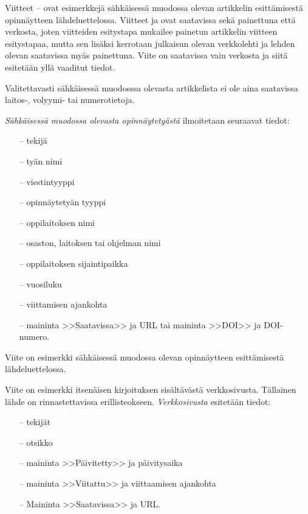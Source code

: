 \documentclass[english,12pt,a4paper,pdftex]{article}
\begin{document}
Viitteet \cite{Ribeiro}--\cite{kone} ovat esimerkkejä sähkäisessä
muodossa olevan artikkelin esittämisestä opinnäytteen
lähdeluettelossa.  Viitteet \cite{Ribeiro} ja \cite{Stieber} ovat
saatavissa sekä painettuna että verkosta, joten viitteiden esitystapa
mukailee painetun artikkelin viitteen esitystapaa, mutta sen lisäksi
kerrotaan julkaisun olevan verkkolehti ja lehden olevan saatavissa
myäs painettuna.  Viite \cite{kone} on saatavissa vain verkosta ja
siitä esitetään yllä vaaditut tiedot.

Valitettavasti sähkäisessä muodosssa olevasta artikkelista ei ole aina
saatavissa lai\-tos-, volyymi- tai numerotietoja.

\textit{Sähkäisessä muodossa olevasta opinnäytetyästä} ilmoitetaan
seuraavat tiedot:

\begin{itemize}
\item[--]tekijä
\item[--]tyän nimi
\item[--]viestintyyppi
\item[--]opinnäytetyän tyyppi
\item[--]oppilaitoksen nimi
\item[--]osaston, laitoksen tai ohjelman nimi
\item[--]oppilaitoksen sijaintipaikka
\item[--]vuosiluku
\item[--]viittamisen ajankohta
\item[--]maininta >>Saatavissa>> ja URL tai
        maininta >>DOI>> ja DOI-numero.
\end{itemize}

Viite \cite{Adida} on esimerkki sähkäisessä muodossa olevan
opinnäytteen esittämisestä lähdeluettelossa.

Viite \cite{viittaaminen} on esimerkki itsenäisen kirjoituksen sisältävästä
verkkosivusta. Tällainen lähde on rinnastettavissa erillisteokseen.
\textit{Verkkosivusta} esitetään tiedot:

\begin{itemize}
\item[--] tekijät
\item[--] otsikko
\item[--] maininta >>Päivitetty>> ja päivitysaika
\item[--] maininta >>Viitattu>> ja viittaamisen ajankohta
\item[--] Maininta >>Saatavissa>> ja URL.
\end{itemize}
\end{document}
